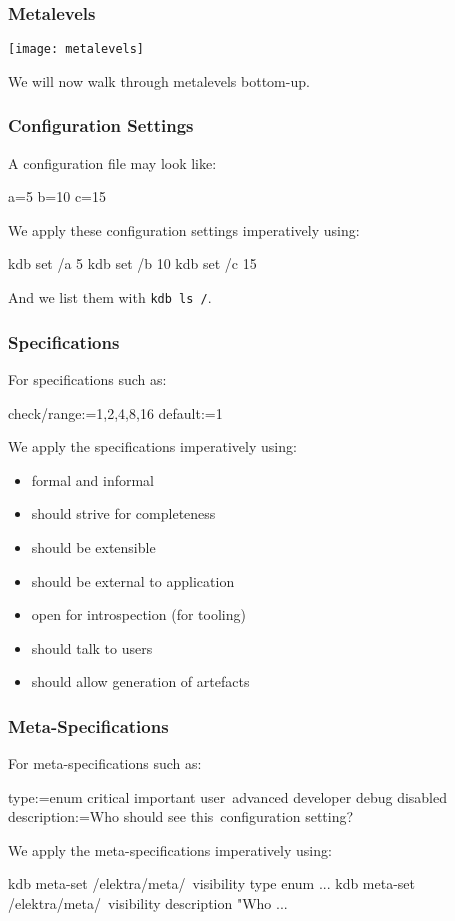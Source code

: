 \begin{frame}
	\frametitle{Metalevels}
	\texttt{[image: metalevels]}

	We will now walk through metalevels bottom-up.
\end{frame}

\begin{frame}[fragile]
	\frametitle{Configuration Settings}

	A configuration file may look like:

	\begin{code}[language=CfgElektra]
	a=5
	b=10
	c=15
	\end{code}

	We apply these configuration settings imperatively using:

	\begin{code}[language=bash]
	kdb set /a 5
	kdb set /b 10
	kdb set /c 15
	\end{code}

	And we list them with \lstinline[language=bash,morekeywords={ls},showspaces=no]^kdb ls /^.
\end{frame}

\begin{frame}[fragile]
	\frametitle{Specifications}
	For specifications such as:

	\begin{code}
	  check/range:=1,2,4,8,16
	  default:=1
	\end{code}

	We apply the specifications imperatively using:

	\pause
	\begin{itemize}
	\item formal and informal
	\item should strive for completeness
	\item should be extensible
	\item should be external to application
	\item open for introspection (for tooling)
	\item should talk to users
	\item should allow generation of artefacts
	\end{itemize}
\end{frame}

\begin{frame}[fragile]
	\frametitle{Meta-Specifications}
	For meta-specifications such as:

	\small
	\begin{code}
	[visibility]
	type:=enum critical important user\
	      advanced developer debug disabled
	description:=Who should see this\
	     configuration setting?
	\end{code}

	We apply the meta-specifications imperatively using:

	\begin{code}[language=bash,morekeywords={meta-set}]
	kdb meta-set /elektra/meta/\
		visibility type enum ...
	kdb meta-set /elektra/meta/\
		visibility description "Who ...
	\end{code}
\end{frame}


